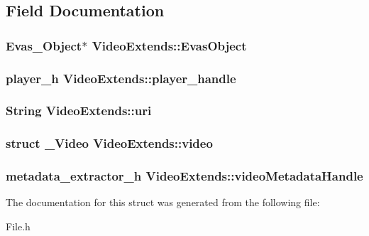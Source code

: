 \subsection{Field Documentation}
\subsubsection[{Evas\-Object}]{\setlength{\rightskip}{0pt plus 5cm}Evas\-\_\-\-Object$\ast$ Video\-Extends\-::\-Evas\-Object}\label{structVideoExtends_aecddbd5fdf75a4464eaa995a35315751}
\subsubsection[{player\-\_\-handle}]{\setlength{\rightskip}{0pt plus 5cm}player\-\_\-h Video\-Extends\-::player\-\_\-handle}\label{structVideoExtends_a14b1800bc05edc10c91121ca30e08efd}
\subsubsection[{uri}]{\setlength{\rightskip}{0pt plus 5cm}String Video\-Extends\-::uri}\label{structVideoExtends_a457a12b9fada6ac0d9d423c6dfb4727c}
\subsubsection[{video}]{\setlength{\rightskip}{0pt plus 5cm}struct {\bf \-\_\-\-Video} Video\-Extends\-::video}\label{structVideoExtends_a4714170e68af888c5ec33071b3eb28dd}
\subsubsection[{video\-Metadata\-Handle}]{\setlength{\rightskip}{0pt plus 5cm}metadata\-\_\-extractor\-\_\-h Video\-Extends\-::video\-Metadata\-Handle}\label{structVideoExtends_a81a79d68608cff7e5e6597abb2457c66}


The documentation for this struct was generated from the following file\-:\begin{DoxyCompactItemize}
\item 
File.\-h\end{DoxyCompactItemize}
